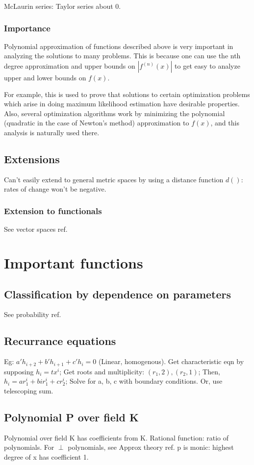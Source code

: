 \documentclass[oneside, article]{memoir}
\begin{document}
McLaurin series: Taylor series about 0.

\subsection{Importance}
Polynomial approximation of functions described above is very important in analyzing the solutions to many problems. This is because one can use the nth degree approximation and upper bounds on $|f^{(n)}(x)|$ to get easy to analyze upper and lower bounds on $f(x)$.

For example, this is used to prove that solutions to certain optimization problems which arise in doing maximum likelihood estimation have desirable properties. Also, several optimization algorithms work by minimizing the polynomial (quadratic in the case of Newton's method) approximation to $f(x)$, and this analysis is naturally used there.

\section{Extensions}
Can't easily extend to general metric spaces by using a distance function $d()$: rates of change won't be negative.

\subsection{Extension to functionals}
See vector spaces ref.

\chapter{Important functions}
\section{Classification by dependence on parameters}
See probability ref.

\section{Recurrance equations}
Eg: $a'h_{i+2}+b'h_{i+1}+c'h_{i}=0$ (Linear, homogenous). Get characteristic eqn by supposing $h_{i} = tx^{i}$; Get roots and multiplicity: $(r_{1},2), (r_{2},1)$; Then, $h_{i} = ar_{1}^{i} + bir_{1}^{i} + cr_{2}^{i}$; Solve for a, b, c with boundary conditions. Or, use telescoping sum.

\section{Polynomial P over field K}
Polynomial over field K has coefficients from K. Rational function: ratio of polynomials. For $\perp$ polynomials, see Approx theory ref. p is monic: highest degree of x has coefficient 1.
\end{document}
